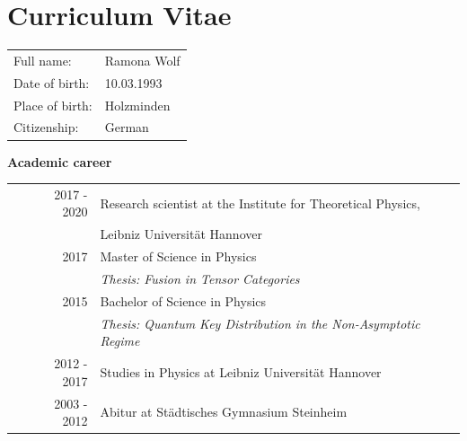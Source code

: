 \chapter*{Curriculum Vitae}

\begin{table}[H]
	\flushleft
	\begin{tabular}{ll}
		Full name: & Ramona Wolf\\
		Date of birth: & 10.03.1993\\
		Place of birth: & Holzminden\\
		Citizenship: & German
	\end{tabular}
\end{table}

\vspace{20pt}

{\large \textbf{Academic career}}

\begin{table}[H]
	\flushleft
	\begin{tabular}{crl}
		\hspace{10pt} & 2017 - 2020 & Research scientist at the Institute for Theoretical Physics,\\
		\hspace{10pt} &  & Leibniz Universität Hannover\vspace{5pt} \\ 
		\hspace{10pt} & 2017 & Master of Science in Physics\\
		\hspace{10pt} &  & \textit{Thesis: Fusion in Tensor Categories} \vspace{5pt} \\
		\hspace{10pt} & 2015 & Bachelor of Science in Physics\\
		\hspace{10pt} & & \textit{Thesis: Quantum Key Distribution in the Non-Asymptotic Regime} \vspace{5pt} \\
		\hspace{10pt} & 2012 - 2017 & Studies in Physics at Leibniz Universität Hannover \vspace{5pt} \\
		\hspace{10pt} & 2003 - 2012 & Abitur at Städtisches Gymnasium Steinheim
	\end{tabular}
\end{table}